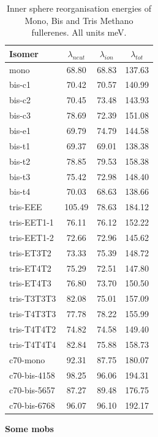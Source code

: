 \documentclass[journal=nanofd,manuscript=suppinfo]{achemso}
\begin{document}
\begin{table}
\centering
\begin{tabular}{lSSS}
\toprule
Isomer & $\lambda_{neut}$ & $\lambda_{ion}$ & $\lambda_{tot}$ \\
\midrule
mono & 68.80 & 68.83 & 137.63 \\
\midrule
bis-c1 & 70.42 & 70.57 & 140.99 \\
bis-c2 & 70.45 & 73.48 & 143.93 \\
bis-c3 & 78.69 & 72.39 & 151.08 \\
bis-e1 & 69.79 & 74.79 & 144.58 \\
bis-t1 & 69.37 & 69.01 & 138.38 \\
bis-t2 & 78.85 & 79.53 & 158.38 \\
bis-t3 & 75.42 & 72.98 & 148.40 \\
bis-t4 & 70.03 & 68.63 & 138.66 \\
\midrule
tris-EEE & 105.49 & 78.63 & 184.12 \\
tris-EET1-1 & 76.11 & 76.12 & 152.22 \\
tris-EET1-2 & 72.66 & 72.96 & 145.62 \\
tris-ET3T2 & 73.33 & 75.39 & 148.72 \\
tris-ET4T2 & 75.29 & 72.51 & 147.80 \\
tris-ET4T3 & 76.80 & 73.70 & 150.50 \\
tris-T3T3T3 & 82.08 & 75.01 & 157.09 \\
tris-T4T3T3 & 77.78 & 78.22 & 155.99 \\
tris-T4T4T2 & 74.82 & 74.58 & 149.40 \\
tris-T4T4T4 & 82.84 & 75.88 & 158.73 \\
\midrule
c70-mono & 92.31 & 87.75 & 180.07 \\
c70-bis-4158 & 98.25 & 96.06 & 194.31 \\
c70-bis-5657 & 87.27 & 89.48 & 176.75 \\
c70-bis-6768 & 96.07 & 96.10 & 192.17 \\
\bottomrule
\end{tabular}
\caption{\label{tab:Lambda}
Inner sphere reorganisation energies of Mono, Bis and Tris Methano fullerenes. All units meV.}
\end{table}




\textbf{Some mobs}
\end{document}
